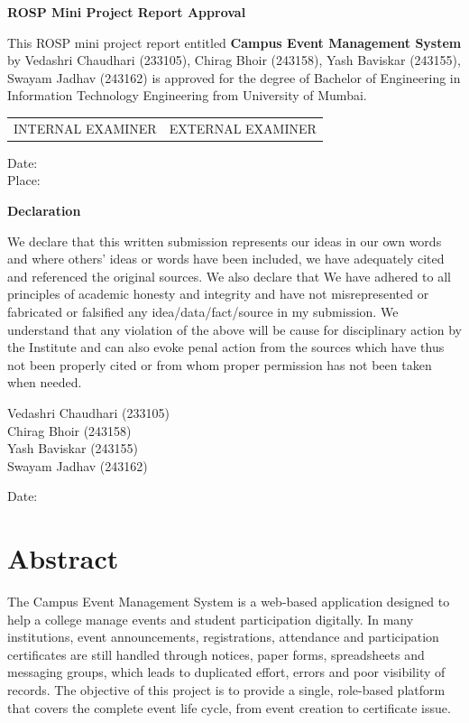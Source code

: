 \documentclass[12pt,a4paper]{report}
\begin{document}
\begin{center}{\large\bfseries ROSP Mini Project Report Approval}\end{center}
This ROSP mini project report entitled \textbf{Campus Event Management System} by Vedashri Chaudhari (233105), Chirag Bhoir (243158), Yash Baviskar (243155), Swayam Jadhav (243162) is approved for the degree of Bachelor of Engineering in Information Technology Engineering from University of Mumbai.

\vspace{3cm}
\noindent
\begin{tabularx}{\textwidth}{XX}
INTERNAL EXAMINER & EXTERNAL EXAMINER
\end{tabularx}

\vspace{2cm}
Date:\\
Place:
\newpage

\begin{center}{\large\bfseries Declaration}\end{center}
We declare that this written submission represents our ideas in our own words and where others' ideas or words have been included, we have adequately cited and referenced the original sources. We also declare that We have adhered to all principles of academic honesty and integrity and have not misrepresented or fabricated or falsified any idea/data/fact/source in my submission. We understand that any violation of the above will be cause for disciplinary action by the Institute and can also evoke penal action from the sources which have thus not been properly cited or from whom proper permission has not been taken when needed.

\vspace{1.5cm}
\begin{flushright}
Vedashri Chaudhari (233105)\\
Chirag Bhoir (243158)\\
Yash Baviskar (243155)\\
Swayam Jadhav (243162)
\end{flushright}
\vspace{1cm}
Date:
\newpage

\setcounter{page}{1}

\chapter*{Abstract}
The Campus Event Management System is a web-based application designed to help a college manage events and student participation digitally. In many institutions, event announcements, registrations, attendance and participation certificates are still handled through notices, paper forms, spreadsheets and messaging groups, which leads to duplicated effort, errors and poor visibility of records. The objective of this project is to provide a single, role-based platform that covers the complete event life cycle, from event creation to certificate issue.
\end{document}
